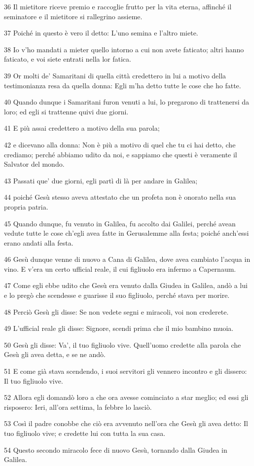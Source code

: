\par 36 Il mietitore riceve premio e raccoglie frutto per la vita eterna, affinché il seminatore e il mietitore si rallegrino assieme.
\par 37 Poiché in questo è vero il detto: L'uno semina e l'altro miete.
\par 38 Io v'ho mandati a mieter quello intorno a cui non avete faticato; altri hanno faticato, e voi siete entrati nella lor fatica.
\par 39 Or molti de' Samaritani di quella città credettero in lui a motivo della testimonianza resa da quella donna: Egli m'ha detto tutte le cose che ho fatte.
\par 40 Quando dunque i Samaritani furon venuti a lui, lo pregarono di trattenersi da loro; ed egli si trattenne quivi due giorni.
\par 41 E più assai credettero a motivo della sua parola;
\par 42 e dicevano alla donna: Non è più a motivo di quel che tu ci hai detto, che crediamo; perché abbiamo udito da noi, e sappiamo che questi è veramente il Salvator del mondo.
\par 43 Passati que' due giorni, egli partì di là per andare in Galilea;
\par 44 poiché Gesù stesso aveva attestato che un profeta non è onorato nella sua propria patria.
\par 45 Quando dunque, fu venuto in Galilea, fu accolto dai Galilei, perché avean vedute tutte le cose ch'egli avea fatte in Gerusalemme alla festa; poiché anch'essi erano andati alla festa.
\par 46 Gesù dunque venne di nuovo a Cana di Galilea, dove avea cambiato l'acqua in vino. E v'era un certo ufficial reale, il cui figliuolo era infermo a Capernaum.
\par 47 Come egli ebbe udito che Gesù era venuto dalla Giudea in Galilea, andò a lui e lo pregò che scendesse e guarisse il suo figliuolo, perché stava per morire.
\par 48 Perciò Gesù gli disse: Se non vedete segni e miracoli, voi non crederete.
\par 49 L'ufficial reale gli disse: Signore, scendi prima che il mio bambino muoia.
\par 50 Gesù gli disse: Va', il tuo figliuolo vive. Quell'uomo credette alla parola che Gesù gli avea detta, e se ne andò.
\par 51 E come già stava scendendo, i suoi servitori gli vennero incontro e gli dissero: Il tuo figliuolo vive.
\par 52 Allora egli domandò loro a che ora avesse cominciato a star meglio; ed essi gli risposero: Ieri, all'ora settima, la febbre lo lasciò.
\par 53 Così il padre conobbe che ciò era avvenuto nell'ora che Gesù gli avea detto: Il tuo figliuolo vive; e credette lui con tutta la sua casa.
\par 54 Questo secondo miracolo fece di nuovo Gesù, tornando dalla Giudea in Galilea.

